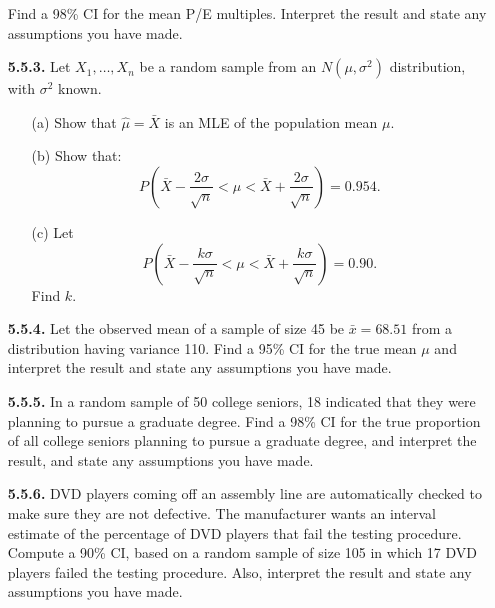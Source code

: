 \begin{enumerate}
    Find a 98\% CI for the mean P/E multiples. Interpret the result and state any assumptions you have made.

    \item[\textbf{5.5.3.}] Let $X_1, \ldots, X_n$ be a random sample from an $N(\mu, \sigma^2)$ distribution, with $\sigma^2$ known.
    \begin{enumerate}
        \item[(a)] Show that $\hat{\mu} = \bar{X}$ is an MLE of the population mean $\mu$.
        \item[(b)] Show that:
        \[
        P\left( \bar{X} - \frac{2\sigma}{\sqrt{n}} < \mu < \bar{X} + \frac{2\sigma}{\sqrt{n}} \right) = 0.954.
        \]
        \item[(c)] Let
        \[
        P\left( \bar{X} - \frac{k\sigma}{\sqrt{n}} < \mu < \bar{X} + \frac{k\sigma}{\sqrt{n}} \right) = 0.90.
        \]
        Find $k$.
    \end{enumerate}

    \item[\textbf{5.5.4.}] Let the observed mean of a sample of size 45 be $\bar{x} = 68.51$ from a distribution having variance 110. Find a 95\% CI for the true mean $\mu$ and interpret the result and state any assumptions you have made.

    \item[\textbf{5.5.5.}] In a random sample of 50 college seniors, 18 indicated that they were planning to pursue a graduate degree. Find a 98\% CI for the true proportion of all college seniors planning to pursue a graduate degree, and interpret the result, and state any assumptions you have made.

    \item[\textbf{5.5.6.}] DVD players coming off an assembly line are automatically checked to make sure they are not defective. The manufacturer wants an interval estimate of the percentage of DVD players that fail the testing procedure. Compute a 90\% CI, based on a random sample of size 105 in which 17 DVD players failed the testing procedure. Also, interpret the result and state any assumptions you have made.
\end{enumerate}
